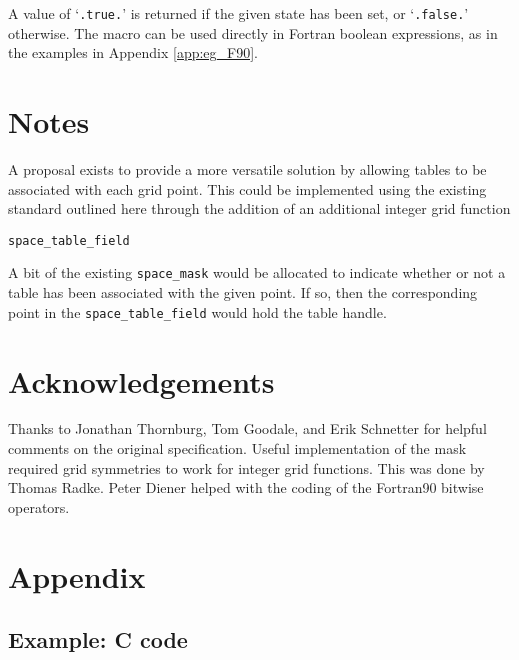 \documentclass{article}
\begin{document}
\noindent A value of `\texttt{.true.}' is returned if the given state
has been set, or `\texttt{.false.}' otherwise. The macro can be used
directly in Fortran boolean expressions, as in the examples in
Appendix \ref{app:eg_F90}.


\section{Notes}

A proposal exists to provide a more versatile solution by allowing
tables to be associated with each grid point. This could be
implemented using the existing standard outlined here through the
addition of an additional integer grid function

\texttt{space\_table\_field}

A bit of the existing \texttt{space\_mask} would be allocated to
indicate whether or not a table has been associated with the given
point. If so, then the corresponding point in the
\texttt{space\_table\_field} would hold the table handle.


\section{Acknowledgements}

Thanks to Jonathan Thornburg, Tom Goodale, and Erik Schnetter for
helpful comments on the original specification. Useful implementation
of the mask required grid symmetries to work for integer grid
functions. This was done by Thomas Radke. Peter Diener helped with the
coding of the Fortran90 bitwise operators.

\section{Appendix}

\subsection{Example: C code}\label{app:eg_C}
\end{document}
